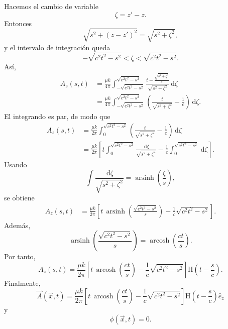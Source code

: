 \documentclass{article}
\numberwithin{equation}{section}
\newcommand{\dd}{\,\mathrm{d}}
\newcommand{\Hh}{\mathrm H}
\newcommand{\arcosh}{\operatorname{arcosh}}
\newcommand{\arsinh}{\operatorname{arsinh}}
\begin{document}
Hacemos el cambio de variable
\begin{equation*}
    \zeta=z'-z.
\end{equation*}
Entonces
\begin{equation*}
    \sqrt{s^2+(z-z')^2}=\sqrt{s^2+\zeta^2},
\end{equation*}
y el intervalo de integración queda
\begin{equation*}
    -\sqrt{c^2t^2-s^2}<\zeta<\sqrt{c^2t^2-s^2}.
\end{equation*}
Así,
\begin{align*}
    A_z(s,t)
    &=\frac{\mu k}{4\pi}
    \int_{-\sqrt{c^2t^2-s^2}}^{\sqrt{c^2t^2-s^2}}
    \frac{t-\frac{\sqrt{s^2+\zeta^2}}{c}}{\sqrt{s^2+\zeta^2}}\dd\zeta \\
    &=\frac{\mu k}{4\pi}
    \int_{-\sqrt{c^2t^2-s^2}}^{\sqrt{c^2t^2-s^2}}
    \left(\frac{t}{\sqrt{s^2+\zeta^2}}-\frac{1}{c}\right)\dd\zeta.
\end{align*}
El integrando es par, de modo que
\begin{align*}
    A_z(s,t)
    &=\frac{\mu k}{2\pi}
    \int_{0}^{\sqrt{c^2t^2-s^2}}
    \left(\frac{t}{\sqrt{s^2+\zeta^2}}-\frac{1}{c}\right)\dd\zeta \\
    &=\frac{\mu k}{2\pi}
    \left[
    t\int_{0}^{\sqrt{c^2t^2-s^2}}
    \frac{\dd\zeta}{\sqrt{s^2+\zeta^2}}
    -\frac{1}{c}\int_{0}^{\sqrt{c^2t^2-s^2}}\dd\zeta
    \right].
\end{align*}
Usando
\begin{equation*}
    \int \frac{\dd\zeta}{\sqrt{s^2+\zeta^2}}
    =\arsinh\left(\frac{\zeta}{s}\right),
\end{equation*}
se obtiene
\begin{align*}
    A_z(s,t)
    &=\frac{\mu k}{2\pi}
    \left[
    t\,\arsinh\left(\frac{\sqrt{c^2t^2-s^2}}{s}\right)
    -\frac{1}{c}\sqrt{c^2t^2-s^2}
    \right].
\end{align*}
Además,
\begin{equation*}
    \arsinh\left(\frac{\sqrt{c^2t^2-s^2}}{s}\right)
    =\arcosh\left(\frac{ct}{s}\right).
\end{equation*}
Por tanto,
\begin{equation*}
    A_z(s,t)
    =\frac{\mu k}{2\pi}
    \left[
    t\,\arcosh\left(\frac{ct}{s}\right)
    -\frac{1}{c}\sqrt{c^2t^2-s^2}
    \right]\Hh\left(t-\frac{s}{c}\right).
\end{equation*}
Finalmente,
\begin{equation*}
    \boxed{
    \vec A(\vec x,t)
    =\frac{\mu k}{2\pi}
    \left[
    t\,\arcosh\left(\frac{ct}{s}\right)
    -\frac{1}{c}\sqrt{c^2t^2-s^2}
    \right]\Hh\left(t-\frac{s}{c}\right)\hat e_z
    }
\end{equation*}
y
\begin{equation*}
    \boxed{\phi(\vec x,t)=0.}
\end{equation*}
\end{document}
